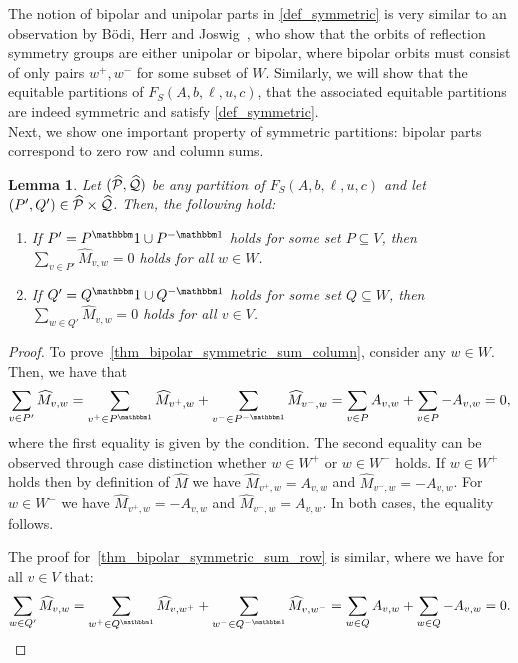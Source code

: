 \documentclass[pdflatex,sn-mathphys-num]{sn-jnl}%
\theoremstyle{thmstyleone}%
\newtheorem{lemma}[lemma]{Lemma}
\theoremstyle{thmstylethree}%
\theoremstyle{thmstyletwo}%
\begin{document}
The notion of bipolar and unipolar parts in \cref{def_symmetric} is very similar to an observation by B{\"o}di, Herr and Joswig~\cite{Bodi2013}, who show that the orbits of reflection symmetry groups are either unipolar or bipolar, where bipolar orbits must consist of only pairs $w^+,w^-$ for some subset of $W$. Similarly, we will show that the equitable partitions of $F_S(A,b,\ell,u,c)$, that the associated equitable partitions are indeed symmetric and satisfy \cref{def_symmetric}. \\

Next, we show one important property of symmetric partitions: bipolar parts correspond to zero row and column sums.
\begin{lemma}
    \label{thm_bipolar_symmetric_sum}
    Let $(\widehat{\mathcal{P}},\widehat{\mathcal{Q}})$ be any partition of $F_S(A,b,\ell,u,c)$ and let $(P',Q') \in \widehat{\mathcal{P}} \times \widehat{\mathcal{Q}}$. Then, the following hold:
    \begin{enumerate}[label=(\roman*)]
        \item \label{thm_bipolar_symmetric_sum_column} If $P' = P^\onevec \cup P^{-\onevec}$ holds for some set $P\subseteq V$, then $\sum_{v\in P'} \widehat{M}_{v,w} = 0$ holds for all $w\in W$. 
        \item \label{thm_bipolar_symmetric_sum_row} If $Q' = Q^\onevec \cup Q^{-\onevec}$ holds for some set $Q\subseteq W$, then $\sum_{w\in Q'} \widehat{M}_{v,w} = 0$ holds for all $v\in V$.
    \end{enumerate}
\end{lemma}
\begin{proof}
    To prove~\ref{thm_bipolar_symmetric_sum_column}, consider any $w\in W$. Then, we have that
    \begin{equation*}
     \sum_{v\in P'} \widehat{M}_{v,w} = \sum_{v^+\in P^{\onevec}} \widehat{M}_{v^+,w} + \sum_{v^-\in P^{-\onevec}} \widehat{M}_{v^-,w} = \sum_{v\in P} A_{v,w} + \sum_{v\in P} -A_{v,w} = 0,    
    \end{equation*}
    where the first equality is given by the condition. 
    The second equality can be observed through case distinction whether $w\in W^+$ or $w\in W^-$ holds. If $w\in W^+$ holds then by definition of $\widehat{M}$ we have $\widehat{M}_{v^+,w} = A_{v,w}$ and $\widehat{M}_{v^-,w} = -A_{v,w}$. For $w\in W^-$ we have  $\widehat{M}_{v^+,w} = -A_{v,w}$ and $\widehat{M}_{v^-,w} = A_{v,w}$. In both cases, the equality follows.
    
    The proof for~\ref{thm_bipolar_symmetric_sum_row} is similar, where we have for all $v\in V$ that:
    \begin{equation*}
     \sum_{w\in Q'} \widehat{M}_{v,w} = \sum_{w^+\in Q^{\onevec}} \widehat{M}_{v,w^+} + \sum_{w^-\in Q^{-\onevec}} \widehat{M}_{v,w^-} = \sum_{w\in Q} A_{v,w} + \sum_{w\in Q} -A_{v,w} = 0.    
    \end{equation*}
\end{proof}
\end{document}

